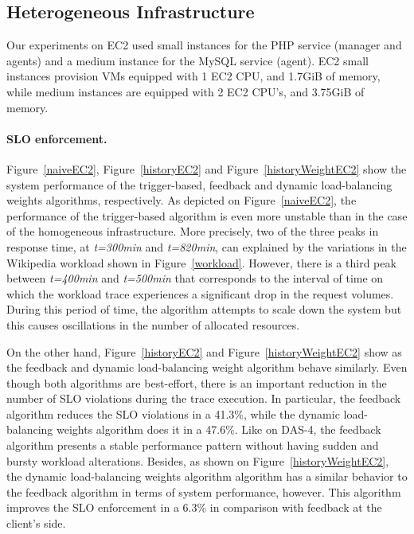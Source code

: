 


\subsection*{Heterogeneous Infrastructure}

Our experiments on EC2 used small instances for the PHP service (manager and agents) and  a medium instance for the MySQL service (agent). EC2 small instances provision VMs equipped with 1 EC2 CPU, and 1.7GiB of memory, while medium instances are equipped with 2 EC2 CPU's, and 3.75GiB of memory.


\paragraph{SLO enforcement.}
Figure~\ref{naiveEC2}, Figure~\ref{historyEC2} and Figure~\ref{historyWeightEC2} show the system performance of the trigger-based, feedback and dynamic load-balancing weights algorithms, respectively. As depicted on Figure~\ref{naiveEC2}, the performance of the trigger-based algorithm is even more unstable than in the case of the homogeneous infrastructure. More precisely, two of the three peaks in response time, at \emph{t=300min} and \emph{t=820min}, can explained by the variations in the Wikipedia workload shown in Figure~\ref{workload}. However, there is a third peak between \emph{t=400min} and \emph{t=500min} that corresponds to the interval of time on which the workload trace experiences a significant drop in the request volumes. During this period of time, the algorithm attempts to scale down the system but this causes oscillations in the number of allocated resources.  

On the other hand, Figure~\ref{historyEC2} and Figure~\ref{historyWeightEC2} show as the feedback and dynamic load-balancing weight algorithm behave similarly. Even though both algorithms are best-effort, there is an important reduction in the number of SLO violations during the trace execution. In particular, the feedback algorithm reduces the SLO violations in a  41.3\%, while the dynamic load-balancing weights algorithm does it in a 47.6\%. Like on DAS-4, the feedback algorithm presents a stable performance pattern without having sudden and bursty workload alterations. Besides, as shown on Figure~\ref{historyWeightEC2}, the dynamic load-balancing weights algorithm algorithm has a similar behavior to the feedback algorithm in terms of system performance, however. This algorithm improves the SLO enforcement in a 6.3\% in comparison with feedback at the client's side. 

